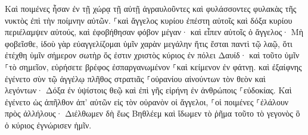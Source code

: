 \documentclass{openreader}
\begin{document}
Καὶ ποιμένες ἦσαν ἐν τῇ χώρᾳ τῇ αὐτῇ ἀγραυλοῦντες καὶ φυλάσσοντες φυλακὰς τῆς νυκτὸς ἐπὶ τὴν ποίμνην αὐτῶν. 
⸀καὶ ἄγγελος κυρίου ἐπέστη αὐτοῖς καὶ δόξα κυρίου περιέλαμψεν αὐτούς, καὶ ἐφοβήθησαν φόβον μέγαν· 
καὶ εἶπεν αὐτοῖς ὁ ἄγγελος· Μὴ φοβεῖσθε, ἰδοὺ γὰρ εὐαγγελίζομαι ὑμῖν χαρὰν μεγάλην ἥτις ἔσται παντὶ τῷ λαῷ, 
ὅτι ἐτέχθη ὑμῖν σήμερον σωτὴρ ὅς ἐστιν χριστὸς κύριος ἐν πόλει Δαυίδ· 
καὶ τοῦτο ὑμῖν ⸀τὸ σημεῖον, εὑρήσετε βρέφος ἐσπαργανωμένον ⸀καὶ κείμενον ἐν φάτνῃ. 
καὶ ἐξαίφνης ἐγένετο σὺν τῷ ἀγγέλῳ πλῆθος στρατιᾶς ⸀οὐρανίου αἰνούντων τὸν θεὸν καὶ λεγόντων· 
Δόξα ἐν ὑψίστοις θεῷ καὶ ἐπὶ γῆς εἰρήνη ἐν ἀνθρώποις ⸀εὐδοκίας. 
Καὶ ἐγένετο ὡς ἀπῆλθον ἀπ’ αὐτῶν εἰς τὸν οὐρανὸν οἱ ἄγγελοι, ⸀οἱ ποιμένες ⸀ἐλάλουν πρὸς ἀλλήλους· Διέλθωμεν δὴ ἕως Βηθλέεμ καὶ ἴδωμεν τὸ ῥῆμα τοῦτο τὸ γεγονὸς ὃ ὁ κύριος ἐγνώρισεν ἡμῖν. 
\end{document}
